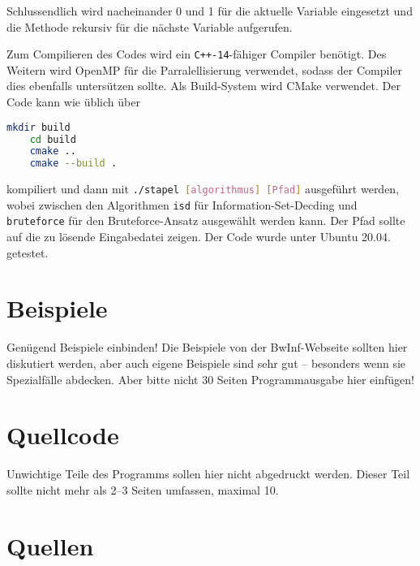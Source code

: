 \documentclass[a4paper,10pt,ngerman]{scrartcl}
\begin{document}
Schlussendlich wird nacheinander 0 und 1 für die aktuelle Variable eingesetzt und die Methode rekursiv für die nächste Variable aufgerufen. 

Zum Compilieren des Codes wird ein \texttt{C++-14}-fähiger Compiler benötigt.
Des Weitern wird OpenMP für die Parralellisierung verwendet, sodass der Compiler dies ebenfalls untersützen sollte. Als Build-System wird CMake verwendet. 
Der Code kann wie üblich über 
\begin{lstlisting}[language=bash]
    mkdir build
    cd build
    cmake ..
    cmake --build . 
\end{lstlisting}    
kompiliert und dann mit \lstinline[language=bash]{./stapel [algorithmus] [Pfad]} ausgeführt werden, wobei zwischen den Algorithmen \lstinline{isd} für Information-Set-Decding und \lstinline{bruteforce} für den Bruteforce-Ansatz ausgewählt werden kann. Der Pfad sollte auf die zu lösende Eingabedatei zeigen. Der Code wurde unter Ubuntu 20.04. getestet.
\section{Beispiele}
Genügend Beispiele einbinden! Die Beispiele von der BwInf-Webseite sollten hier diskutiert werden, aber auch eigene Beispiele sind sehr gut – besonders wenn sie Spezialfälle abdecken. Aber bitte nicht 30 Seiten Programmausgabe hier einfügen!

\section{Quellcode}
Unwichtige Teile des Programms sollen hier nicht abgedruckt werden. Dieser Teil sollte nicht mehr als 2–3 Seiten umfassen, maximal 10.

\section{Quellen}
\printbibliography
\end{document}
